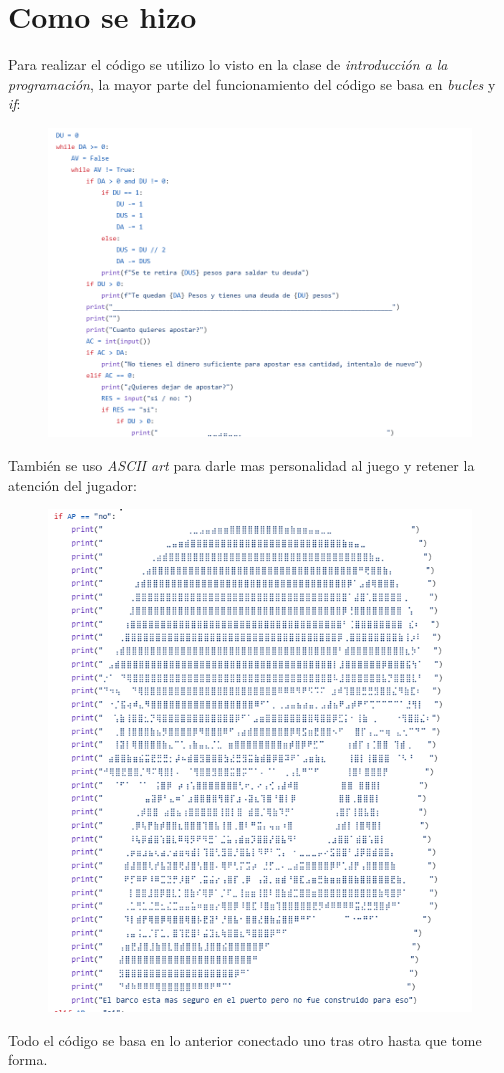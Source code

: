 \section{Como se hizo}

Para realizar el código se utilizo lo visto en la clase de \textit{introducción a la programación}, la mayor parte del funcionamiento del código se basa en \textit{bucles} y \textit{if}:

\begin{figure}[h]
    \raggedright
    \includegraphics[width=0.5\linewidth]{Imagenes/C1.PNG}
\end{figure}

También se uso \textit{ASCII art} para darle mas personalidad al juego y retener la atención del jugador:

\begin{figure}[h]
    \raggedright
    \includegraphics[width=0.5\linewidth]{Imagenes/C2.PNG}
\end{figure}

Todo el código se basa en lo anterior conectado uno tras otro hasta que tome forma.